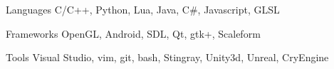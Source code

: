 


\begin{cvskills}


\cvskill
{Languages} %
{C/C++, Python, Lua, Java, C\#, Javascript, GLSL } %

\cvskill
{Frameworks}
{OpenGL, Android, SDL, Qt, gtk+, Scaleform}

\cvskill
{Tools}
{Visual Studio, vim, git, bash, Stingray, Unity3d, Unreal, CryEngine}



\end{cvskills}
